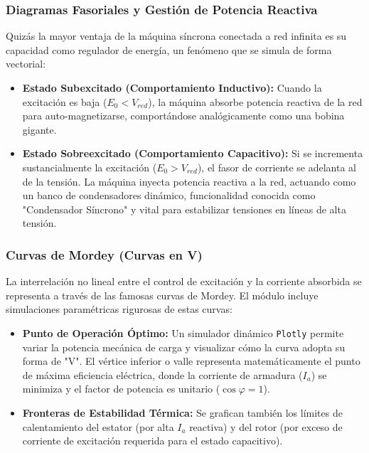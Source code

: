\documentclass[11pt,a4paper]{article}
\begin{document}
\subsubsection{Diagramas Fasoriales y Gestión de Potencia Reactiva}
Quizás la mayor ventaja de la máquina síncrona conectada a red infinita es su capacidad como regulador de energía, un fenómeno que se simula de forma vectorial:
\begin{itemize}
    \item \textbf{Estado Subexcitado (Comportamiento Inductivo):} Cuando la excitación es baja ($E_0 < V_{red}$), la máquina absorbe potencia reactiva de la red para auto-magnetizarse, comportándose analógicamente como una bobina gigante.
    \item \textbf{Estado Sobreexcitado (Comportamiento Capacitivo):} Si se incrementa sustancialmente la excitación ($E_0 > V_{red}$), el fasor de corriente se adelanta al de la tensión. La máquina inyecta potencia reactiva a la red, actuando como un banco de condensadores dinámico, funcionalidad conocida como "Condensador Síncrono" y vital para estabilizar tensiones en líneas de alta tensión.
\end{itemize}

\subsubsection{Curvas de Mordey (Curvas en V)}
La interrelación no lineal entre el control de excitación y la corriente absorbida se representa a través de las famosas curvas de Mordey. El módulo incluye simulaciones paramétricas rigurosas de estas curvas:
\begin{itemize}
    \item \textbf{Punto de Operación Óptimo:} Un simulador dinámico \texttt{Plotly} permite variar la potencia mecánica de carga y visualizar cómo la curva adopta su forma de "V". El vértice inferior o valle representa matemáticamente el punto de máxima eficiencia eléctrica, donde la corriente de armadura ($I_a$) se minimiza y el factor de potencia es unitario ($\cos \varphi = 1$).
    \item \textbf{Fronteras de Estabilidad Térmica:} Se grafican también los límites de calentamiento del estator (por alta $I_a$ reactiva) y del rotor (por exceso de corriente de excitación requerida para el estado capacitivo).
\end{itemize}
\end{document}
